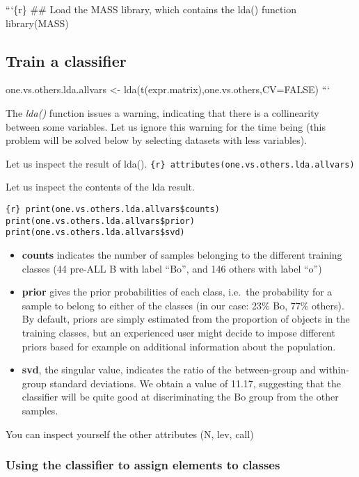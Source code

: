```\{r\} \#\# Load the MASS library, which contains the lda() function
library(MASS)

\subsection{Train a classifier}\label{train-a-classifier}

one.vs.others.lda.allvars \textless{}-
lda(t(expr.matrix),one.vs.others,CV=FALSE) ```

The \emph{lda()} function issues a warning, indicating that there is a
collinearity between some variables. Let us ignore this warning for the
time being (this problem will be solved below by selecting datasets with
less variables).

Let us inspect the result of lda().
\texttt{\{r\} attributes(one.vs.others.lda.allvars)}

Let us inspect the contents of the lda result.

\texttt{\{r\} print(one.vs.others.lda.allvars\$counts) print(one.vs.others.lda.allvars\$prior) print(one.vs.others.lda.allvars\$svd)}

\begin{itemize}
\item
  \textbf{counts} indicates the number of samples belonging to the
  different training classes (44 pre-ALL B with label ``Bo'', and 146
  others with label ``o'')
\item
  \textbf{prior} gives the {prior probabilities} of each class, i.e.~the
  probability for a sample to belong to either of the classes (in our
  case: 23\% Bo, 77\% others). By default, priors are simply estimated
  from the proportion of objects in the training classes, but an
  experienced user might decide to impose different priors based for
  example on additional information about the population.
\item
  \textbf{svd}, the singular value, indicates the ratio of the
  between-group and within-group standard deviations. We obtain a value
  of 11.17, suggesting that the classifier will be quite good at
  discriminating the Bo group from the other samples.
\end{itemize}

You can inspect yourself the other attributes (N, lev, call)

\subsubsection{Using the classifier to assign elements to
classes}\label{using-the-classifier-to-assign-elements-to-classes}

